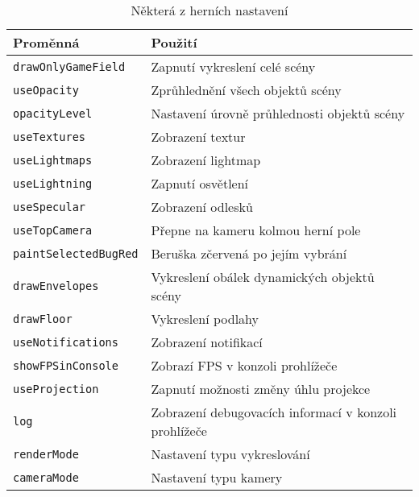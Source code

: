 \begin{table}
\label{table:settings}
\begin{center}
\begin{tabular}{ | l | l |}
\hline
\textbf{Proměnná} & \textbf{Použití} \\ \hline
\texttt{drawOnlyGameField} & Zapnutí vykreslení celé scény \\ \hline
\texttt{useOpacity} & Zprůhlednění všech objektů scény \\ \hline
\texttt{opacityLevel} & Nastavení úrovně průhlednosti objektů scény \\ \hline
\texttt{useTextures} & Zobrazení textur \\ \hline
\texttt{useLightmaps} & Zobrazení lightmap \\ \hline
\texttt{useLightning} & Zapnutí osvětlení \\ \hline
\texttt{useSpecular} & Zobrazení odlesků \\ \hline
\texttt{useTopCamera} & Přepne na kameru kolmou herní pole \\ \hline
\texttt{paintSelectedBugRed} & Beruška zčervená po jejím vybrání  \\ \hline
\texttt{drawEnvelopes} & Vykreslení obálek dynamických objektů scény  \\ \hline
\texttt{drawFloor} & Vykreslení podlahy \\ \hline
\texttt{useNotifications} & Zobrazení notifikací \\ \hline
\texttt{showFPSinConsole} & Zobrazí FPS v konzoli prohlížeče \\ \hline
\texttt{useProjection} & Zapnutí možnosti změny úhlu projekce\\ \hline
\texttt{log} & Zobrazení debugovacích informací v konzoli prohlížeče \\ \hline
\texttt{renderMode} & Nastavení typu vykreslování \\ \hline
\texttt{cameraMode} & Nastavení typu kamery \\ \hline
\end{tabular}
\end{center}
\caption{Některá z herních nastavení}
\end{table}